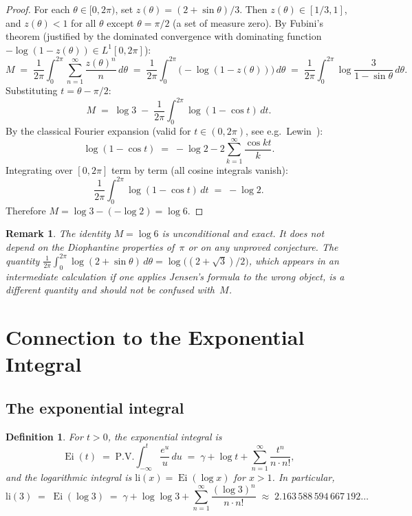 \documentclass[12pt]{amsart}
\newtheorem{definition}[theorem]{Definition}
\newtheorem{remark}[theorem]{Remark}
\DeclareMathOperator{\Ei}{Ei}
\newcommand{\li}{\mathrm{li}}
\begin{document}
\begin{proof}
For each $\theta\in[0,2\pi)$, set $z(\theta)=(2+\sin\theta)/3$.
Then $z(\theta)\in[1/3,1]$, and $z(\theta)<1$ for all $\theta$
except $\theta=\pi/2$ (a set of measure zero).
By Fubini's theorem (justified by the dominated convergence with
dominating function $-\log(1-z(\theta))\in L^1[0,2\pi]$):
\[
  M \;=\; \frac{1}{2\pi}\int_{0}^{2\pi}
          \sum_{n=1}^{\infty}\frac{z(\theta)^n}{n}\,d\theta
    \;=\; \frac{1}{2\pi}\int_{0}^{2\pi}
          \bigl(-\log(1-z(\theta))\bigr)\,d\theta
    \;=\; \frac{1}{2\pi}\int_{0}^{2\pi}
          \log\frac{3}{1-\sin\theta}\,d\theta.
\]
Substituting $t=\theta-\pi/2$:
\[
  M \;=\; \log 3
        \;-\; \frac{1}{2\pi}\int_{0}^{2\pi}\log(1-\cos t)\,dt.
\]
By the classical Fourier expansion (valid for $t\in(0,2\pi)$, see
e.g.\ Lewin~\cite{Lewin1981}):
\[
  \log(1-\cos t) \;=\; -\log 2 - 2\sum_{k=1}^{\infty}\frac{\cos kt}{k}.
\]
Integrating over $[0,2\pi]$ term by term (all cosine integrals
vanish):
\[
  \frac{1}{2\pi}\int_{0}^{2\pi}\log(1-\cos t)\,dt \;=\; -\log 2.
\]
Therefore $M=\log 3-(-\log 2)=\log 6$.
\end{proof}

\begin{remark}\label{rem:M-log6-exact}
The identity $M=\log 6$ is \emph{unconditional and exact}.
It does not depend on the Diophantine properties of~$\pi$ or on any
unproved conjecture.  The quantity $\frac{1}{2\pi}\int_0^{2\pi}
\log(2+\sin\theta)\,d\theta=\log\bigl((2+\sqrt{3})/2\bigr)$, which
appears in an intermediate calculation if one applies Jensen's formula
to the wrong object, is a \emph{different} quantity and should not be
confused with~$M$.
\end{remark}

\section{Connection to the Exponential Integral}

\subsection{The exponential integral}

\begin{definition}\label{def:Ei}
For $t>0$, the exponential integral is
\[
  \Ei(t) \;=\; \mathrm{P.V.}\int_{-\infty}^{t}\frac{e^u}{u}\,du
           \;=\; \gamma+\log t
                 +\sum_{n=1}^{\infty}\frac{t^n}{n\cdot n!},
\]
and the logarithmic integral is $\li(x)=\Ei(\log x)$ for $x>1$.
In particular,
\begin{equation}\label{eq:Ei-log3}
  \li(3) \;=\; \Ei(\log 3)
         \;=\; \gamma+\log\log 3
               +\sum_{n=1}^{\infty}\frac{(\log 3)^n}{n\cdot n!}
         \;\approx\; 2.163\,588\,594\,667\,192\ldots
\end{equation}
\end{definition}
\end{document}

